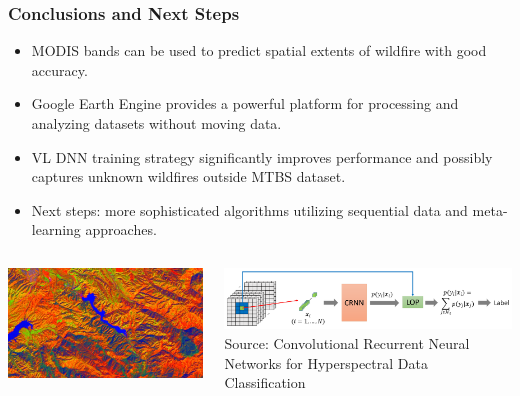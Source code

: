 \documentclass{beamer}
\begin{document}
\begin{frame}
  \frametitle{Conclusions and Next Steps}
\scriptsize
	      \begin{itemize}
               \item MODIS bands can be used to predict spatial extents of wildfire with good accuracy.

	       \item Google Earth Engine provides a powerful platform for processing and analyzing datasets without moving data.
	       \item VL DNN training strategy significantly improves performance and possibly captures unknown wildfires outside MTBS dataset. 
	       \item Next steps: more sophisticated algorithms 
utilizing sequential data and meta-learning approaches.  
              \end{itemize}







 
 
     \begin{columns}[T]
    \begin{column}{.5\textwidth}
     
   \includegraphics[width=1.0\textwidth]{figs/gee_spectral.png}

   \centering
   \vspace{-0.2cm}

    \end{column}
    \begin{column}{.5\textwidth}
    \vspace{-0.2cm}
    
 
    \includegraphics[width=1.0\textwidth]{figs/crnn_rs.png}
\\
\tiny 
\centering
Source: Convolutional Recurrent Neural Networks for
Hyperspectral Data Classification \cite{rs9030298}
   
    \end{column}
  \end{columns}
\end{frame}
\end{document}
